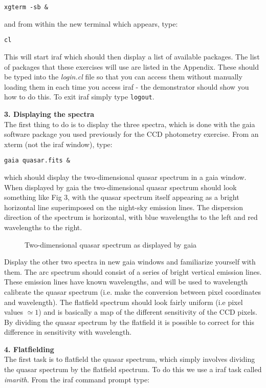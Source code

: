 {\tt \verb,xgterm -sb &,}

\noindent
and from within the new terminal which appears, type:

{\tt cl}

\noindent
This will start {\sc iraf} which should then display a list of available
packages. The list of packages that these exercises will use are listed in the Appendix. These should be typed into the {\it login.cl} file so that you can access them without manually loading them in each time you access {\sc iraf} - the demonstrator should show you how to do this. To exit {\sc iraf} simply type {\tt logout}.

{\large {\bf 3. Displaying the spectra}}\\
The first thing to do is to display the three spectra, which is done
with the {\sc gaia} software package you used previously for the CCD
photometry exercise. From an xterm (not the {\sc iraf} window), type:

{\tt gaia quasar.fits \&}

which should display the two-dimensional quasar spectrum in a {\sc gaia}
window. When displayed by {\sc gaia} the two-dimensional
quasar spectrum should look something like Fig 3, with the quasar spectrum
itself appearing as a bright horizontal line superimposed on the night-sky
emission lines. The dispersion direction of the spectrum is
horizontal, with blue wavelengths to the left and red wavelengths to
the right.
\begin{figure}
\centerline{}
\caption{Two-dimensional quasar spectrum as displayed by {\sc gaia}}
\end{figure}

Display the other two spectra in new {\sc gaia} windows and familiarize yourself with them. The
arc spectrum should consist of a series of bright vertical emission
lines. These emission lines have known wavelengths, and will be used 
to wavelength calibrate the quasar spectrum (i.e. make the conversion 
between pixel coordinates and wavelength). The flatfield spectrum
should look fairly uniform (i.e pixel values $\simeq1$) and is
basically a map of the different sensitivity 
of the CCD pixels. By dividing the quasar spectrum by the flatfield 
it is possible to correct for this difference in sensitivity with wavelength.


{\large {\bf 4. Flatfielding}}\\
The first task is to flatfield the quasar spectrum, which simply involves
dividing the quasar spectrum by the flatfield spectrum. To do this we
use a {\sc iraf} task called {\it imarith}. From the {\sc iraf} command prompt type:

